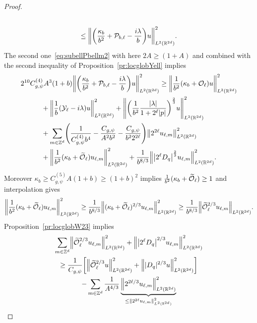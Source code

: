 \documentclass[AHL,Unicode,longabstracts]{cedram}
\newcommand{\Z}{\mathbb{Z}}
\newcommand{\R}{\mathbb{R}}
\newcommand{\clY}{\mathcal{Y}}
\newcommand{\clO}{\mathcal{O}}
\newcommand{\clP}{\mathcal{P}}
\let\oldtilde\tilde
\renewcommand*{\tilde}[1]{\mathchoice{\widetilde{#1}}{\widetilde{#1}}{\oldtilde{#1}}{\oldtilde{#1}}}
\let\originalleft\left
\let\originalright\right
\renewcommand{\left}{\mathopen{}\mathclose\bgroup\originalleft}
\renewcommand{\right}{\aftergroup\egroup\originalright}
\begin{document}
\begin{proof}
\begin{multline*}
\\\leq
\left\| \left(\frac{\kappa_{b}}{b^{2}}+\clP_{b,\ell} - \frac{i\lambda}{b}\right) u \right\|^{2}_{L^2(\R^{2d})}.
\end{multline*}
The second one~\eqref{eq:subellPbellm2} with here $2A\geq (1+A)$ and combined with the second inequality of Proposition~\ref{pr:locglobYell} implies
\begin{multline*}
2^{10}C_{g,\psi}^{(4)}A^{3}(1+b)\left\| \left(\frac{\kappa_{b}}{b^{2}}+\clP_{b,\ell} - \frac{i\lambda}{b}\right) u \right\|^{2}_{L^2(\R^{2d})}
\geq\left\|\frac{1}{b^{2}}(\kappa_{b}+\clO_{\ell})u\right\|_{L^{2}(\R^{2d})}^{2}\\
\begin{aligned}
&+\left\|\frac{1}{b}(\clY_{\ell}-i\lambda)u\right\|_{L^{2}(\R^{2d})}^{2} +\left\| \left(\frac{1}{b^2} \frac{|\lambda|}{1+2^{\ell}|p|} \right)^{\frac{2}{3}} u \right\|_{L^2(\R^{2d})}^{2}
\\ &+\sum_{m\in\Z^{d}}\left(\frac{1}{C^{(4)}_{g,\psi}b^{4}}-\frac{C_{g,\psi}}{A^{2}b^{2}}-\frac{C_{g,\psi}}{b^{2}2^{2\ell}}\right)
\left\|2^{2\ell}u_{\ell,m}\right\|_{L^{2}(\R^{2d})}^{2}
\\
&+
\left\|\frac{1}{b^{2}}(\kappa_{b}+\tilde{\clO}_{\ell}) u_{\ell,m}\right\|_{L^2(\R^{2d})}^2+ \frac{1}{b^{8/3}}\left\|\left|2^{\ell}D_{q} \right|^{\frac{2}{3}} u_{\ell,m} \right\|_{L^2(\R^{2d})}^{2}.
\end{aligned}
\end{multline*}
Moreover $\kappa_{b}\geq C^{(5)}_{g,\psi}A(1+b)\geq (1+b)^{2}$ implies $\frac{1}{b^{2}}(\kappa_{b}+\tilde{\clO}_{\ell})\geq 1$ and interpolation gives
\[
\left\|\frac{1}{b^{2}}(\kappa_{b}+\tilde{\clO}_{\ell}) u_{\ell,m}\right\|_{L^2(\R^{2d})}^2\geq \frac{1}{b^{8/3}}\left\|(\kappa_b+\tilde{\clO}_{\ell})^{2/3} u_{\ell,m}\right\|_{L^2(\R^{2d})}^2\geq \frac{1}{b^{8/3}}\left\|\tilde{\clO}_{\ell}^{2/3}u_{\ell,m}\right\|_{L^2(\R^{2d})}.
\]
Proposition~\ref{pr:locglobW23} implies
\begin{multline*}
\sum_{m\in\Z^{d}}\left\|\tilde{\clO}_{\ell}^{2/3}u_{\ell,m}\right\|_{L^{2}(\R^{2d})}^{2}+
\left\|\left|2^{\ell}D_{q}\right|^{2/3}u_{\ell,m}\right\|_{L^{2}(\R^{2d})}^{2}
\\
\geq
\frac{1}{C_{g,\psi}}\left[
\left\|\tilde{\clO}_{\ell}^{2/3}u\right\|_{L^{2}(\R^{2d})}^{2}+
\left\||D_{q}|^{2/3}u\right\|_{L^{2}(\R^{2d})}^{2}
\right]\\
-\sum_{m\in\Z^{d}}\frac{1}{A^{4/3}}
\underbrace{\left\|2^{2\ell/3}u_{\ell,m}\right\|_{L^{2}(\R^{2d})}^{2}}_{\leq \left\|2^{2\ell}u_{\ell,m}\right\|_{L^{2}(\R^{2d})}^{2}}

\end{multline*}
\end{proof}
\end{document}
